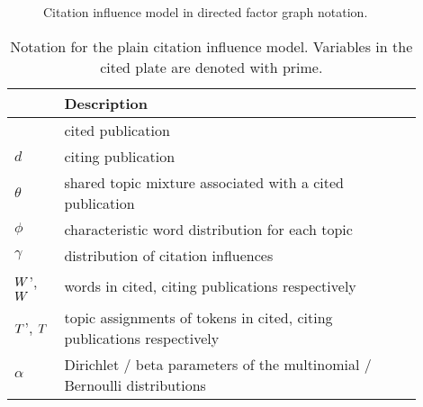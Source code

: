 \documentclass[a4paper]{article}
\begin{document}
\begin{figure}[H]
\begin{centering}

\par\end{centering}

\caption{Citation influence model in directed factor graph notation.\label{fig:Citinf-plain-model}}

\end{figure}




%
\begin{table}[H]
\caption[Notation for the plain citation influence model.]{Notation for the plain citation influence model. Variables in the
cited plate are denoted with prime.}


\label{tab:Variable-description-plain}

{\small }\begin{tabular}{|>{\centering}p{0.11\linewidth}|>{\raggedright}p{0.79\linewidth}|}
\hline 
{\small Symbol} & {\small Description}\tabularnewline
\hline
\hline 
{\small $\up c$, $c$} & {\small cited publication}\tabularnewline
\hline 
{\small $d$} & {\small citing publication}\tabularnewline
\hline 
{\small $\theta$} & {\small shared topic mixture associated with a cited publication}\tabularnewline
\hline 
{\small $\phi$} & {\small characteristic word distribution for each topic}\tabularnewline
\hline 
{\small $\gamma$} & {\small distribution of citation influences}\tabularnewline
\hline 
{\small $\up w$', $\up w$} & {\small words in cited, citing publications respectively}\tabularnewline
\hline 
{\small $\up t$', $\up t$} & {\small topic assignments of tokens in cited, citing publications
respectively}\tabularnewline
\hline 
{\small $\alpha$} & {\small Dirichlet / beta parameters of the multinomial / Bernoulli
distributions}\tabularnewline
\hline
\end{tabular}
\end{table}
\end{document}
